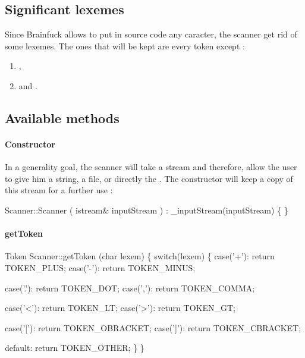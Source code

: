 \subsection{Significant lexemes\label{significantLexemes}}
Since Brainfuck allows to put in source code any caracter, the scanner get rid 
of some lexemes. The ones that will be kept are every token except :
\begin{enumerate}
        \item {},
        \item and .
\end{enumerate}

\subsection{Available methods}
\paragraph{Constructor} 
In a generality goal, the scanner will take a stream and therefore, allow the 
user to give him a string, a file, or directly the . The
constructor will keep a copy of this stream for a further use :

\nwenddocs{}\endmoddef\nwstartdeflinemarkup\nwenddeflinemarkup
Scanner::Scanner ( istream& inputStream ) 
: _inputStream(inputStream)
\{ \}
\nwendcode{}\nwdocspar

\paragraph{getToken}
\nwenddocs{}\endmoddef\nwstartdeflinemarkup\nwenddeflinemarkup
Token Scanner::getToken (char lexem) \{
                switch(lexem) \{
                        case('+'): return TOKEN_PLUS;
                        case('-'): return TOKEN_MINUS;
                                   
                        case('.'): return TOKEN_DOT;
                        case(','): return TOKEN_COMMA;

                        case('<'): return TOKEN_LT;
                        case('>'): return TOKEN_GT;

                        case('['): return TOKEN_OBRACKET;
                        case(']'): return TOKEN_CBRACKET;

                        default: return TOKEN_OTHER;
                \}
\}
\nwendcode{}\nwdocspar

